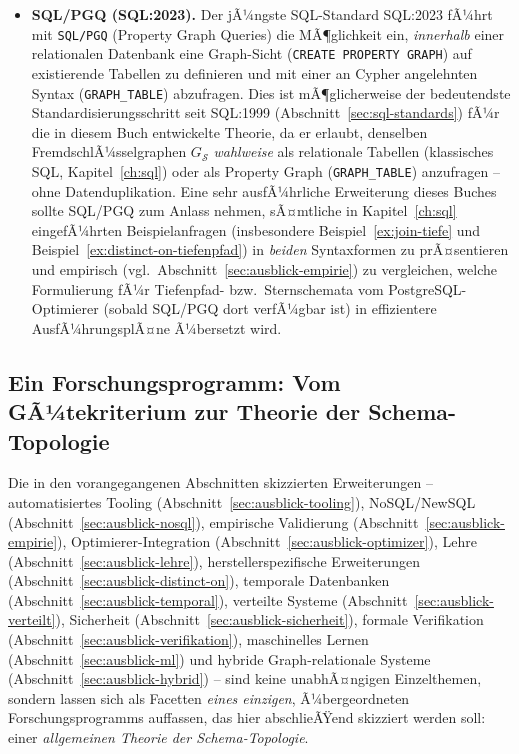 ﻿\documentclass[a4paper,12pt]{report}
\theoremstyle{definition}
\theoremstyle{remark}
\begin{document}
\begin{itemize}
  \item \textbf{SQL/PGQ (SQL:2023).} Der jÃ¼ngste SQL-Standard
    SQL:2023 fÃ¼hrt mit \texttt{SQL/PGQ} (Property Graph Queries) die
    MÃ¶glichkeit ein, \emph{innerhalb} einer relationalen Datenbank
    eine Graph-Sicht (\texttt{CREATE PROPERTY GRAPH}) auf
    existierende Tabellen zu definieren und mit einer an Cypher
    angelehnten Syntax (\texttt{GRAPH\_TABLE}) abzufragen. Dies ist
    mÃ¶glicherweise der bedeutendste Standardisierungsschritt seit
    SQL:1999 (Abschnitt~\ref{sec:sql-standards}) fÃ¼r die in diesem
    Buch entwickelte Theorie, da er erlaubt, denselben
    FremdschlÃ¼sselgraphen $G_{\mathcal{S}}$ \emph{wahlweise} als
    relationale Tabellen (klassisches SQL,
    Kapitel~\ref{ch:sql}) oder als Property Graph
    (\texttt{GRAPH\_TABLE}) anzufragen -- ohne Datenduplikation. Eine
    sehr ausfÃ¼hrliche Erweiterung dieses Buches sollte SQL/PGQ zum
    Anlass nehmen, sÃ¤mtliche in Kapitel~\ref{ch:sql} eingefÃ¼hrten
    Beispielanfragen (insbesondere Beispiel~\ref{ex:join-tiefe} und
    Beispiel~\ref{ex:distinct-on-tiefenpfad}) in \emph{beiden}
    Syntaxformen zu prÃ¤sentieren und empirisch (vgl.\
    Abschnitt~\ref{sec:ausblick-empirie}) zu vergleichen, welche
    Formulierung fÃ¼r Tiefenpfad- bzw.\ Sternschemata vom
    PostgreSQL-Optimierer (sobald SQL/PGQ dort verfÃ¼gbar ist) in
    effizientere AusfÃ¼hrungsplÃ¤ne Ã¼bersetzt wird.
\end{itemize}

\subsection{Ein Forschungsprogramm: Vom GÃ¼tekriterium zur Theorie der Schema-Topologie}
\label{sec:ausblick-forschungsprogramm}

Die in den vorangegangenen Abschnitten skizzierten Erweiterungen --
automatisiertes Tooling (Abschnitt~\ref{sec:ausblick-tooling}),
NoSQL/NewSQL (Abschnitt~\ref{sec:ausblick-nosql}), empirische
Validierung (Abschnitt~\ref{sec:ausblick-empirie}),
Optimierer-Integration (Abschnitt~\ref{sec:ausblick-optimizer}),
Lehre (Abschnitt~\ref{sec:ausblick-lehre}), herstellerspezifische
Erweiterungen (Abschnitt~\ref{sec:ausblick-distinct-on}), temporale
Datenbanken (Abschnitt~\ref{sec:ausblick-temporal}), verteilte
Systeme (Abschnitt~\ref{sec:ausblick-verteilt}), Sicherheit
(Abschnitt~\ref{sec:ausblick-sicherheit}), formale Verifikation
(Abschnitt~\ref{sec:ausblick-verifikation}), maschinelles Lernen
(Abschnitt~\ref{sec:ausblick-ml}) und hybride Graph-relationale
Systeme (Abschnitt~\ref{sec:ausblick-hybrid}) -- sind keine
unabhÃ¤ngigen Einzelthemen, sondern lassen sich als Facetten
\emph{eines einzigen}, Ã¼bergeordneten Forschungsprogramms auffassen,
das hier abschlieÃŸend skizziert werden soll: einer
\emph{allgemeinen Theorie der Schema-Topologie}.
\end{document}
